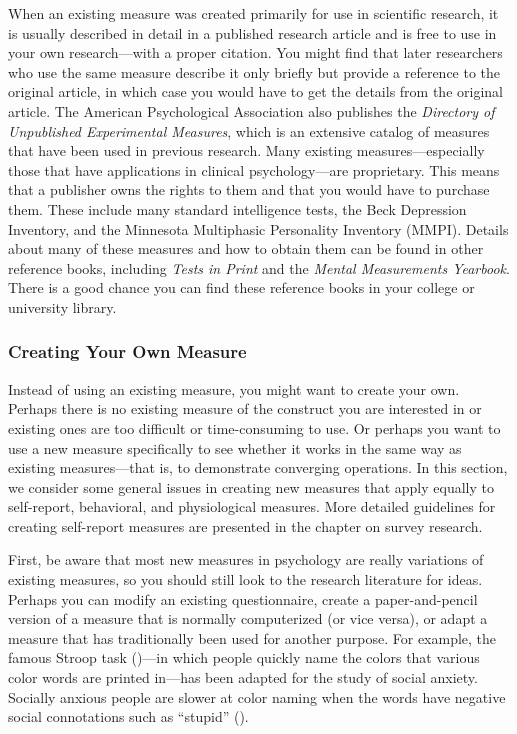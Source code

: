 \documentclass[
]{krantz}
\begin{document}
When an existing measure was created primarily for use in scientific research, it is usually described in detail in a published research article and is free to use in your own research---with a proper citation. You might find that later researchers who use the same measure describe it only briefly but provide a reference to the original article, in which case you would have to get the details from the original article. The American Psychological Association also publishes the \emph{Directory of Unpublished Experimental Measures}, which is an extensive catalog of measures that have been used in previous research. Many existing measures---especially those that have applications in clinical psychology---are proprietary. This means that a publisher owns the rights to them and that you would have to purchase them. These include many standard intelligence tests, the Beck Depression Inventory, and the Minnesota Multiphasic Personality Inventory (MMPI). Details about many of these measures and how to obtain them can be found in other reference books, including \emph{Tests in Print} and the \emph{Mental Measurements Yearbook}. There is a good chance you can find these reference books in your college or university library.

\subsubsection*{Creating Your Own Measure}\label{creating-your-own-measure}


Instead of using an existing measure, you might want to create your own. Perhaps there is no existing measure of the construct you are interested in or existing ones are too difficult or time-consuming to use. Or perhaps you want to use a new measure specifically to see whether it works in the same way as existing measures---that is, to demonstrate converging operations. In this section, we consider some general issues in creating new measures that apply equally to self-report, behavioral, and physiological measures. More detailed guidelines for creating self-report measures are presented in the chapter on survey research.

First, be aware that most new measures in psychology are really variations of existing measures, so you should still look to the research literature for ideas. Perhaps you can modify an existing questionnaire, create a paper-and-pencil version of a measure that is normally computerized (or vice versa), or adapt a measure that has traditionally been used for another purpose. For example, the famous Stroop task ()---in which people quickly name the colors that various color words are printed in---has been adapted for the study of social anxiety. Socially anxious people are slower at color naming when the words have negative social connotations such as ``stupid'' ().
\end{document}

